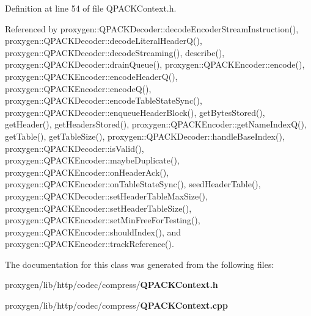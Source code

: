 Definition at line 54 of file Q\+P\+A\+C\+K\+Context.\+h.



Referenced by proxygen\+::\+Q\+P\+A\+C\+K\+Decoder\+::decode\+Encoder\+Stream\+Instruction(), proxygen\+::\+Q\+P\+A\+C\+K\+Decoder\+::decode\+Literal\+Header\+Q(), proxygen\+::\+Q\+P\+A\+C\+K\+Decoder\+::decode\+Streaming(), describe(), proxygen\+::\+Q\+P\+A\+C\+K\+Decoder\+::drain\+Queue(), proxygen\+::\+Q\+P\+A\+C\+K\+Encoder\+::encode(), proxygen\+::\+Q\+P\+A\+C\+K\+Encoder\+::encode\+Header\+Q(), proxygen\+::\+Q\+P\+A\+C\+K\+Encoder\+::encode\+Q(), proxygen\+::\+Q\+P\+A\+C\+K\+Decoder\+::encode\+Table\+State\+Sync(), proxygen\+::\+Q\+P\+A\+C\+K\+Decoder\+::enqueue\+Header\+Block(), get\+Bytes\+Stored(), get\+Header(), get\+Headers\+Stored(), proxygen\+::\+Q\+P\+A\+C\+K\+Encoder\+::get\+Name\+Index\+Q(), get\+Table(), get\+Table\+Size(), proxygen\+::\+Q\+P\+A\+C\+K\+Decoder\+::handle\+Base\+Index(), proxygen\+::\+Q\+P\+A\+C\+K\+Decoder\+::is\+Valid(), proxygen\+::\+Q\+P\+A\+C\+K\+Encoder\+::maybe\+Duplicate(), proxygen\+::\+Q\+P\+A\+C\+K\+Encoder\+::on\+Header\+Ack(), proxygen\+::\+Q\+P\+A\+C\+K\+Encoder\+::on\+Table\+State\+Sync(), seed\+Header\+Table(), proxygen\+::\+Q\+P\+A\+C\+K\+Decoder\+::set\+Header\+Table\+Max\+Size(), proxygen\+::\+Q\+P\+A\+C\+K\+Encoder\+::set\+Header\+Table\+Size(), proxygen\+::\+Q\+P\+A\+C\+K\+Encoder\+::set\+Min\+Free\+For\+Testing(), proxygen\+::\+Q\+P\+A\+C\+K\+Encoder\+::should\+Index(), and proxygen\+::\+Q\+P\+A\+C\+K\+Encoder\+::track\+Reference().



The documentation for this class was generated from the following files\+:\begin{DoxyCompactItemize}
\item 
proxygen/lib/http/codec/compress/{\bf Q\+P\+A\+C\+K\+Context.\+h}\item 
proxygen/lib/http/codec/compress/{\bf Q\+P\+A\+C\+K\+Context.\+cpp}\end{DoxyCompactItemize}
